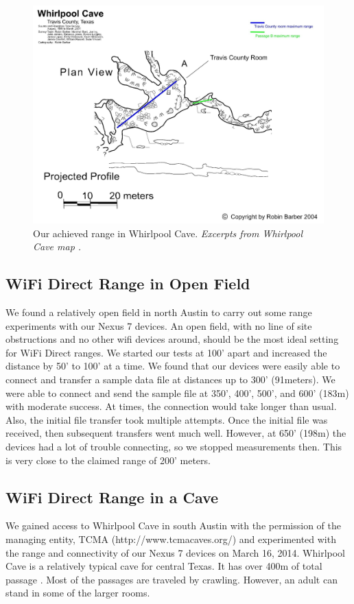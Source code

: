 \documentclass[10pt,twocolumn]{article}
\begin{document}
\begin{figure}[t]
\includegraphics[width=\textwidth]{our_whirlpool_experiments}
\caption{Our achieved range in Whirlpool Cave. \textit{Excerpts from Whirlpool Cave map \cite{wp_map}.}}
\label{fig:whirlpool_map}
\end{figure}

\subsection{WiFi Direct Range in Open Field}
\label{sec:WiFi Direct Range in Open Field}
We found a relatively open field in north Austin to carry out some range experiments with our Nexus 7 devices.
An open field, with no line of site obstructions and no other wifi devices around, should be the most ideal setting for WiFi Direct ranges.
We started our tests at 100' apart and increased the distance by 50' to 100' at a time.
We found that our devices were easily able to connect and transfer a sample data file at distances up to 300' (91meters). 
We were able to connect and send the sample file at 350', 400', 500', and 600' (183m) with moderate success. 
At times, the connection would take longer than usual.
Also, the initial file transfer took multiple attempts.
Once the initial file was received, then subsequent transfers went much well.
However, at 650' (198m) the devices had a lot of trouble connecting, so we stopped measurements then.
This is very close to the claimed range of 200' meters.

\subsection{WiFi Direct Range in a Cave}
\label{sec:WiFi Direct Range in a Cave}
We gained access to Whirlpool Cave in south Austin with the permission of the managing entity, TCMA (http://www.tcmacaves.org/) and experimented with the range and connectivity of our Nexus 7 devices on March 16, 2014.
Whirlpool Cave is a relatively typical cave for central Texas.
It has over 400m of total passage \cite{whirlpool}. 
Most of the passages are traveled by crawling.
However, an adult can stand in some of the larger rooms.
\end{document}
